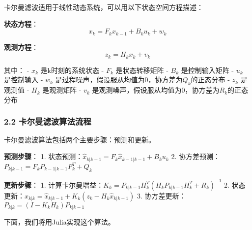 \documentclass[11pt]{article}
\begin{document}
卡尔曼滤波适用于线性动态系统，可以用以下状态空间方程描述：

\textbf{状态方程}： \[x_k = F_k x_{k-1} + B_k u_k + w_k\]

\textbf{观测方程}： \[z_k = H_k x_k + v_k\]

其中： - \(x_k\) 是k时刻的系统状态 - \(F_k\) 是状态转移矩阵 - \(B_k\)
是控制输入矩阵 - \(u_k\) 是控制输入 - \(w_k\)
是过程噪声，假设服从均值为0，协方差为\(Q_k\)的正态分布 - \(z_k\)
是观测值 - \(H_k\) 是观测矩阵 - \(v_k\)
是观测噪声，假设服从均值为0，协方差为\(R_k\)的正态分布

    \subsubsection{2.2
卡尔曼滤波算法流程}\label{ux5361ux5c14ux66fcux6ee4ux6ce2ux7b97ux6cd5ux6d41ux7a0b}

卡尔曼滤波算法包括两个主要步骤：预测和更新。

\textbf{预测步骤}： 1.
状态预测：\(\hat{x}_{k|k-1} = F_k \hat{x}_{k-1|k-1} + B_k u_k\) 2.
协方差预测：\(P_{k|k-1} = F_k P_{k-1|k-1} F_k^T + Q_k\)

\textbf{更新步骤}： 1.
计算卡尔曼增益：\(K_k = P_{k|k-1} H_k^T (H_k P_{k|k-1} H_k^T + R_k)^{-1}\)
2.
状态更新：\(\hat{x}_{k|k} = \hat{x}_{k|k-1} + K_k (z_k - H_k \hat{x}_{k|k-1})\)
3. 协方差更新：\(P_{k|k} = (I - K_k H_k) P_{k|k-1}\)

下面，我们将用Julia实现这个算法。
\end{document}
